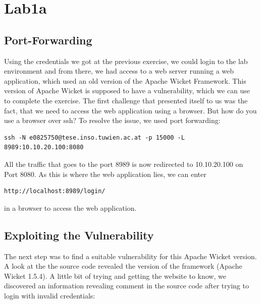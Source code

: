 \documentclass[12pt,a4paper,titlepage,oneside]{scrartcl}
\begin{document}
\maketitle
\setcounter{section}{0}
\setcounter{tocdepth}{2}
\tableofcontents

%
%

\section{Lab1a}

\subsection{Port-Forwarding}

Using the credentials we got at the previous exercise, we could login to the lab environment and from there, we had access to a web server running a web application, which used an old version of the Apache Wicket Framework. This version of Apache Wicket is supposed to have a vulnerability, which we can use to complete the exercise.
The first challenge that presented itself to us was the fact, that we need to access the web application using a browser. But how do you use a browser over ssh? To resolve the issue, we used port forwarding:

\begin{lstlisting}[style=simple]
ssh -N e0825750@tese.inso.tuwien.ac.at -p 15000 -L 8989:10.10.20.100:8080
\end{lstlisting}

All the traffic that goes to the port 8989 is now redirected to 10.10.20.100 on Port 8080. As this is where the web application lies, we can enter

\begin{lstlisting}[style=simple]
http://localhost:8989/login/
\end{lstlisting}

in a browser to access the web application.

\newpage
\subsection{Exploiting the Vulnerability}
The next step was to find a suitable vulnerability for this Apache Wicket version. A look at the the source code revealed the version of the framework (Apache Wicket 1.5.4). A little bit of trying and getting the website to know, we discovered an information revealing comment in the source code after trying to login with invalid credentials:
\end{document}
